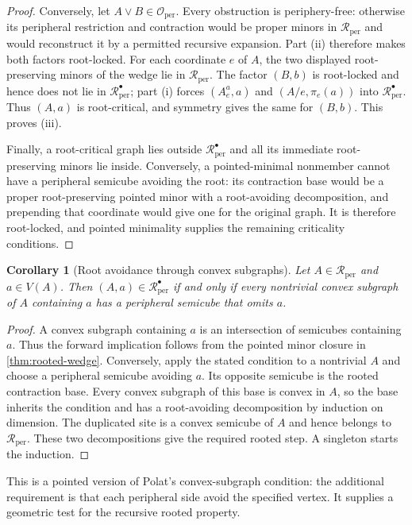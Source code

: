 \documentclass[11pt]{article}
\newtheorem{corollary}[theorem]{Corollary}
\theoremstyle{definition}
\theoremstyle{remark}
\newcommand{\Rper}{\mathcal R_{\mathrm{per}}}
\newcommand{\Rbullet}{\mathcal R_{\mathrm{per}}^{\bullet}}
\newcommand{\Oper}{\mathcal O_{\mathrm{per}}}
\begin{document}
\begin{proof}
Conversely, let \(A\vee B\in\Oper\).  Every obstruction is periphery-free:
otherwise its peripheral restriction and contraction would be proper minors
in \(\Rper\) and would reconstruct it by a permitted recursive expansion.
Part (ii) therefore makes both factors root-locked.  For each coordinate
\(e\) of \(A\), the two displayed root-preserving minors of the wedge lie
in \(\Rper\).  The factor \((B,b)\) is root-locked and hence does not lie in
\(\Rbullet\); part (i) forces \((A_e^a,a)\) and
\((A/e,\pi_e(a))\) into \(\Rbullet\).  Thus \((A,a)\) is root-critical, and
symmetry gives the same for \((B,b)\).  This proves (iii).

Finally, a root-critical graph lies outside \(\Rbullet\) and all its
immediate root-preserving minors lie inside.  Conversely, a pointed-minimal
nonmember cannot have a peripheral semicube avoiding the root: its
contraction base would be a proper root-preserving pointed minor with a
root-avoiding decomposition, and prepending that coordinate would give one
for the original graph.  It is therefore root-locked, and pointed
minimality supplies the remaining criticality conditions.
\end{proof}

\begin{corollary}[Root avoidance through convex subgraphs]
\label{cor:rooted-convex}
Let \(A\in\Rper\) and \(a\in V(A)\). Then \((A,a)\in\Rbullet\) if and
only if every nontrivial convex subgraph of \(A\) containing \(a\) has a
peripheral semicube that omits \(a\).
\end{corollary}

\begin{proof}
A convex subgraph containing \(a\) is an intersection of semicubes
containing \(a\). Thus the forward implication follows from the pointed
minor closure in \cref{thm:rooted-wedge}.
Conversely, apply the stated condition to a nontrivial \(A\) and choose a
peripheral semicube avoiding \(a\). Its opposite semicube is the rooted
contraction base. Every convex subgraph of this base is convex in \(A\),
so the base inherits the condition and has a root-avoiding decomposition
by induction on dimension. The duplicated site is a convex semicube of
\(A\) and hence belongs to \(\Rper\). These two decompositions give the
required rooted step. A singleton starts the induction.
\end{proof}

This is a pointed version of Polat's convex-subgraph condition: the
additional requirement is that each peripheral side avoid the specified
vertex. It supplies a geometric test for the recursive rooted property.
\end{document}
